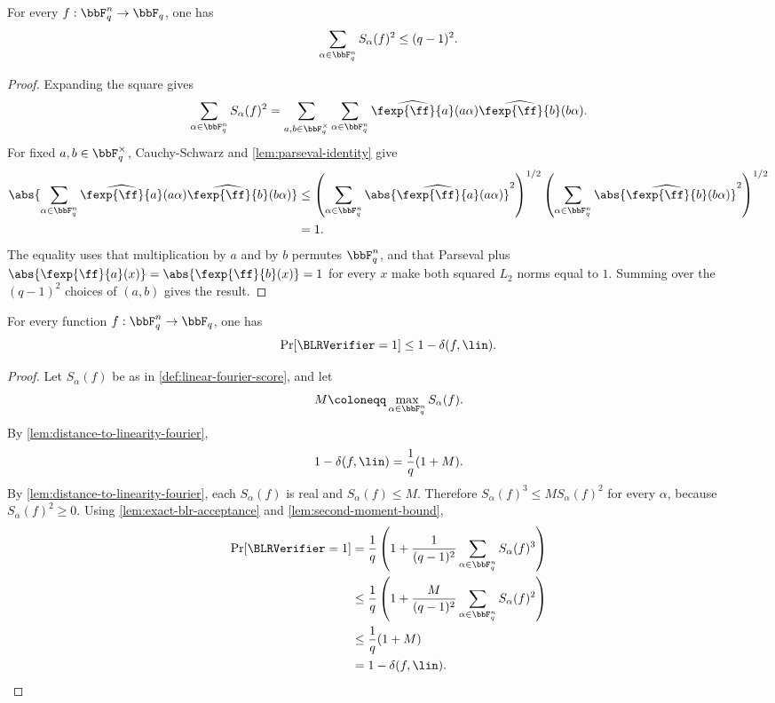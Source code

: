\begin{lemma}
\label{lem:second-moment-bound}
\leanok
For every $f:\bbF_q^n\to\bbF_q$, one has
\[
    \sum_{\alpha\in\bbF_q^n} S_\alpha(f)^2 \le (q-1)^2.
\]
\end{lemma}

\begin{proof}\leanok
Expanding the square gives
\[
    \sum_{\alpha\in\bbF_q^n} S_\alpha(f)^2
    =\sum_{a,b\in\bbF_q^\times}
        \sum_{\alpha\in\bbF_q^n}
        \widehat{\fexp{\ff}{a}}(a\alpha)
        \widehat{\fexp{\ff}{b}}(b\alpha).
\]
For fixed $a,b\in\bbF_q^\times$, Cauchy-Schwarz and
\cref{lem:parseval-identity} give
\begin{align*}
\abs{\sum_{\alpha\in\bbF_q^n}
        \widehat{\fexp{\ff}{a}}(a\alpha)
        \widehat{\fexp{\ff}{b}}(b\alpha)}
&\le
\left(\sum_{\alpha\in\bbF_q^n}\abs{\widehat{\fexp{\ff}{a}}(a\alpha)}^2\right)^{1/2}
\left(\sum_{\alpha\in\bbF_q^n}\abs{\widehat{\fexp{\ff}{b}}(b\alpha)}^2\right)^{1/2} \\
&=1.
\end{align*}
The equality uses that multiplication by $a$ and by $b$ permutes $\bbF_q^n$, and that
Parseval plus $\abs{\fexp{\ff}{a}(x)}=\abs{\fexp{\ff}{b}(x)}=1$ for every $x$
make both squared $L_2$ norms equal to \(1\).
Summing over the $(q-1)^2$ choices of $(a,b)$ gives the result.
\end{proof}

\begin{theorem}
\label{thm:finite-field-blr-soundness}
\leanok
For every function $f:\bbF_q^n\to\bbF_q$, one has
\[
    \Pr[\BLRVerifier=1] \le 1-\delta(f,\lin).
\]
\end{theorem}

\begin{proof}\leanok
Let $S_\alpha(f)$ be as in \cref{def:linear-fourier-score}, and let
\[
    M \coloneqq \max_{\alpha\in\bbF_q^n}S_\alpha(f).
\]
By \cref{lem:distance-to-linearity-fourier},
\[
    1-\delta(f,\lin)=\frac{1}{q}(1+M).
\]
By \cref{lem:distance-to-linearity-fourier}, each $S_\alpha(f)$ is real and
$S_\alpha(f)\le M$.
Therefore $S_\alpha(f)^3\le M S_\alpha(f)^2$ for every $\alpha$, because
$S_\alpha(f)^2\ge 0$.
Using \cref{lem:exact-blr-acceptance} and \cref{lem:second-moment-bound},
\begin{align*}
    \Pr[\BLRVerifier=1]
    &=\frac{1}{q}\left(1+\frac{1}{(q-1)^2}
        \sum_{\alpha\in\bbF_q^n}S_\alpha(f)^3\right) \\
    &\le \frac{1}{q}\left(1+\frac{M}{(q-1)^2}
        \sum_{\alpha\in\bbF_q^n}S_\alpha(f)^2\right) \\
    &\le \frac{1}{q}(1+M) \\
    &=1-\delta(f,\lin).
\end{align*}
\end{proof}

